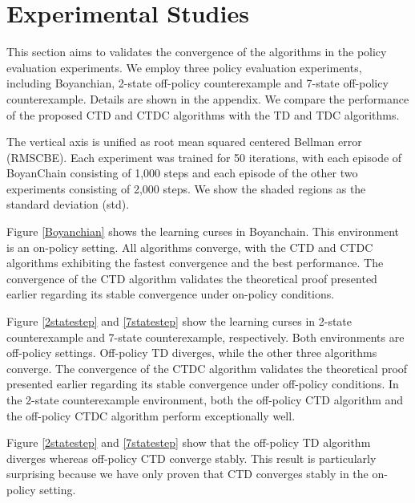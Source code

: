 \section{Experimental Studies}

This section aims to validates the convergence of the algorithms
in the policy evaluation experiments.
We employ  three policy evaluation experiments, 
including {Boyanchian}, {2-state off-policy counterexample} 
and {7-state off-policy counterexample}.
Details are shown in the appendix.
We compare the performance of 
the proposed CTD and CTDC algorithms with  the TD and TDC algorithms.

The vertical axis is unified as root mean squared centered Bellman error (RMSCBE).
Each experiment was trained for 50 iterations, with each 
episode of BoyanChain consisting of 1,000 steps and each 
episode of the other two experiments consisting of 2,000 
steps. We show the shaded regions  as the standard 
deviation (std).

Figure \ref{Boyanchian} shows the learning curses in Boyanchain.
This environment is an on-policy setting. 
All algorithms converge, with the CTD and CTDC 
algorithms exhibiting the fastest convergence and 
the best performance. The convergence of the CTD algorithm 
validates the theoretical proof presented earlier regarding 
its stable convergence under on-policy conditions.

Figure \ref{2statestep} and \ref{7statestep} 
show the learning curses in 2-state counterexample and 
7-state counterexample, respectively.
Both environments are off-policy settings. 
Off-policy TD diverges, while the other 
three algorithms converge.  
The convergence of the CTDC algorithm validates 
the theoretical proof presented earlier regarding 
its stable convergence under off-policy conditions.
In the 2-state counterexample environment, both the
off-policy CTD algorithm and the off-policy CTDC algorithm
 perform exceptionally well.

Figure \ref{2statestep} and \ref{7statestep} show that
 the off-policy TD algorithm diverges 
 whereas off-policy CTD converge stably. This result is 
particularly surprising because we have only proven that CTD converges 
stably in the on-policy setting.

